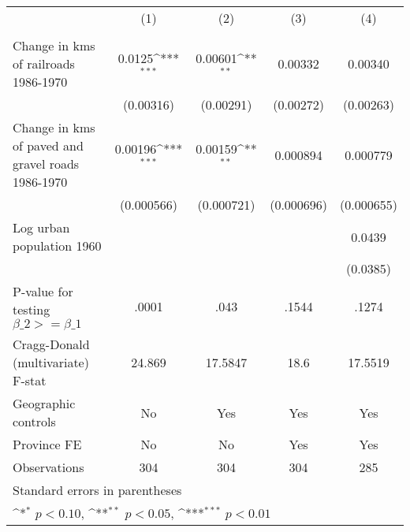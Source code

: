 {
\def\sym#1{\ifmmode^{#1}\else\(^{#1}\)\fi}
\begin{tabular}{l*{4}{c}}
\hline\hline
                &\multicolumn{1}{c}{(1)}&\multicolumn{1}{c}{(2)}&\multicolumn{1}{c}{(3)}&\multicolumn{1}{c}{(4)}\\
                &\multicolumn{1}{c}{}&\multicolumn{1}{c}{}&\multicolumn{1}{c}{}&\multicolumn{1}{c}{}\\
\hline
Change in kms of railroads 1986-1970&   0.0125\sym{***}&  0.00601\sym{**} &  0.00332         &  0.00340         \\
                &(0.00316)         &(0.00291)         &(0.00272)         &(0.00263)         \\
[1em]
Change in kms of paved and gravel roads 1986-1970&  0.00196\sym{***}&  0.00159\sym{**} & 0.000894         & 0.000779         \\
                &(0.000566)         &(0.000721)         &(0.000696)         &(0.000655)         \\
[1em]
Log urban population 1960&                  &                  &                  &   0.0439         \\
                &                  &                  &                  & (0.0385)         \\
\hline
P-value for testing $\beta\_{2} >= \beta\_{1}$&    .0001         &     .043         &    .1544         &    .1274         \\
Cragg-Donald (multivariate) F-stat&   24.869         &  17.5847         &     18.6         &  17.5519         \\
Geographic controls&       No         &      Yes         &      Yes         &      Yes         \\
Province FE     &       No         &       No         &      Yes         &      Yes         \\
Observations    &      304         &      304         &      304         &      285         \\
\hline\hline
\multicolumn{5}{l}{\footnotesize Standard errors in parentheses}\\
\multicolumn{5}{l}{\footnotesize \sym{*} \(p<0.10\), \sym{**} \(p<0.05\), \sym{***} \(p<0.01\)}\\
\end{tabular}
}
